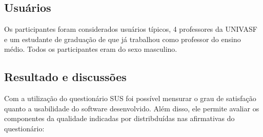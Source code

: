 \subsection{Usuários}

Os participantes foram considerados usuários típicos, 4 professores da UNIVASF e
um estudante de graduação de que já trabalhou como professor do ensino médio. Todos os
participantes eram do sexo masculino.

\subsection{Resultado e discussões}

Com a utilização do questionário SUS foi possível mensurar o grau de satisfação quanto
a usabilidade do software desenvolvido. Além disso, ele permite avaliar os componentes da
qualidade indicadas por  distribduídas nas afirmativas do questionário:

